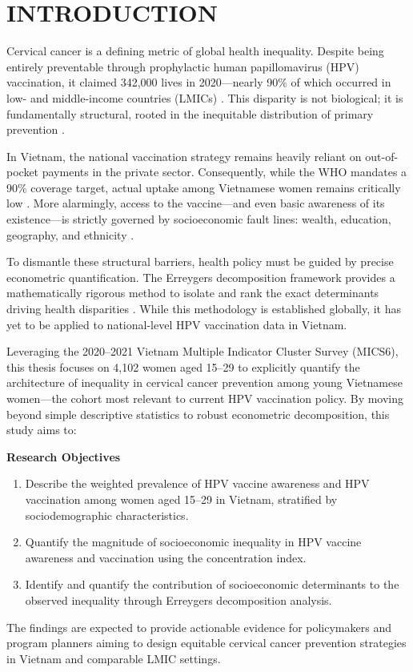 \chapter*{INTRODUCTION}
{}

Cervical cancer is a defining metric of global health inequality. Despite being entirely preventable through prophylactic human papillomavirus (HPV) vaccination, it claimed 342,000 lives in 2020---nearly 90\% of which occurred in low- and middle-income countries (LMICs) \cite{sung2021}. This disparity is not biological; it is fundamentally structural, rooted in the inequitable distribution of primary prevention \cite{arbyn2020}.

In Vietnam, the national vaccination strategy remains heavily reliant on out-of-pocket payments in the private sector. Consequently, while the WHO mandates a 90\% coverage target, actual uptake among Vietnamese women remains critically low \cite{bruni2023,nguyen2021}. More alarmingly, access to the vaccine---and even basic awareness of its existence---is strictly governed by socioeconomic fault lines: wealth, education, geography, and ethnicity \cite{tran2022,pham2020}.

To dismantle these structural barriers, health policy must be guided by precise econometric quantification. The Erreygers decomposition framework provides a mathematically rigorous method to isolate and rank the exact determinants driving health disparities \cite{erreygers2009}. While this methodology is established globally, it has yet to be applied to national-level HPV vaccination data in Vietnam.

Leveraging the 2020--2021 Vietnam Multiple Indicator Cluster Survey (MICS6), this thesis focuses on 4,102 women aged 15--29 \cite{unicef2022} to explicitly quantify the architecture of inequality in cervical cancer prevention among young Vietnamese women---the cohort most relevant to current HPV vaccination policy. By moving beyond simple descriptive statistics to robust econometric decomposition, this study aims to:

\textbf{Research Objectives}
\begin{enumerate}
	\item Describe the weighted prevalence of HPV vaccine awareness and HPV vaccination among women aged 15--29 in Vietnam, stratified by sociodemographic characteristics.
	\item Quantify the magnitude of socioeconomic inequality in HPV vaccine awareness and vaccination using the concentration index.
	\item Identify and quantify the contribution of socioeconomic determinants to the observed inequality through Erreygers decomposition analysis.
\end{enumerate}

The findings are expected to provide actionable evidence for policymakers and program planners aiming to design equitable cervical cancer prevention strategies in Vietnam and comparable LMIC settings.

\clearpage

